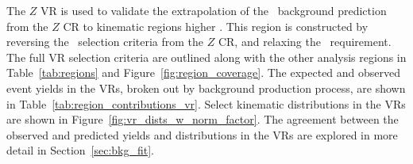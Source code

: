 The $Z$ VR is used to validate the extrapolation of the \ZGAMMAJETS\ background
prediction from the $Z$ CR to kinematic regions higher \HT.
This region is constructed by reversing the \HT\ selection criteria from the
$Z$ CR, and relaxing the \METSIG\ requirement.
The full VR selection criteria are outlined along with the other analysis
regions in Table~\ref{tab:regions} and Figure~\ref{fig:region_coverage}.
The expected and observed event yields in the VRs, broken out by background
production process, are shown in Table~\ref{tab:region_contributions_vr}.
Select kinematic distributions in the VRs are shown in
Figure~\ref{fig:vr_dists_w_norm_factor}.
The agreement between the observed and predicted yields and distributions in the
VRs are explored in more detail in Section~\ref{sec:bkg_fit}.

\begin{table}
  \caption{Number of expected events in each of the VRs broken down by process.
    The uncertainty in the total background prediction is the MC statistical
    uncertainty only for each background process.
    The total uncertainty is obtained by summing the uncertainty in each
    background process in quadrature.
    The $k_Z$ normalization factor is applied to the \ZGAMMAJETS\ background
    yield estimate.
    For each signal model, the ratio of expected signal events to the sum of the
    background in each region is show in parentheses.
    {\color{red} TODO add observed number events in each VR.}
    {\color{red} TODO update with only stat uncertainty.}
    {\color{red} TODO update with breakdown by flavor channel.}
  }
  \label{tab:region_contributions_vr}
\end{table}
